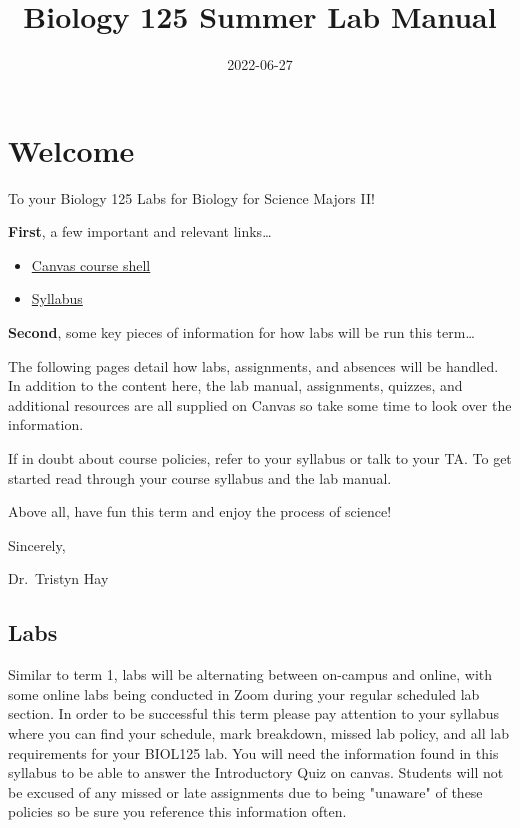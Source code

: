 \documentclass[
]{book}
\title{Biology 125 Summer Lab Manual}
\author{}
\date{\vspace{-2.5em}2022-06-27}
\providecommand{\tightlist}{%
  \setlength{\itemsep}{0pt}\setlength{\parskip}{0pt}}
\begin{document}
\maketitle

{
\setcounter{tocdepth}{1}
\tableofcontents
}
\hypertarget{welcome}{%
\chapter*{Welcome}\label{welcome}}

To your Biology 125 Labs for Biology for Science Majors II!

\textbf{First}, a few important and relevant links\ldots{}

\begin{itemize}
\tightlist
\item
  \href{https://canvas.ubc.ca/courses/94573}{Canvas course shell}
\item
  \href{https://canvas.ubc.ca/courses/94573/files/20871008}{Syllabus}
\end{itemize}

\textbf{Second}, some key pieces of information for how labs will be run this term\ldots{}

The following pages detail how labs, assignments, and absences will be handled. In addition to the content here, the lab manual, assignments, quizzes, and additional resources are all supplied on Canvas so take some time to look over the information.

If in doubt about course policies, refer to your syllabus or talk to your TA. To get started read through your course syllabus and the lab manual.

Above all, have fun this term and enjoy the process of science!

Sincerely,

Dr.~Tristyn Hay

\hypertarget{labs}{%
\section*{Labs}\label{labs}}

Similar to term 1, labs will be alternating between on-campus and online, with some online labs being conducted in Zoom during your regular scheduled lab section. In order to be successful this term please pay attention to your syllabus where you can find your schedule, mark breakdown, missed lab policy, and all lab requirements for your BIOL125 lab. You will need the information found in this syllabus to be able to answer the Introductory Quiz on canvas. Students will not be excused of any missed or late assignments due to being "unaware" of these policies so be sure you reference this information often.
\end{document}
